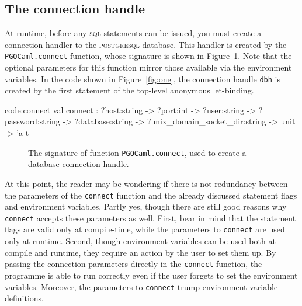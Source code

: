 \documentclass[11pt]{article}
\newcommand{\postgresql}{\textsc{postgresql}\xspace}
\newcommand{\sql}{\textsc{sql}\xspace}
\newcommand{\displaycodesave}[1]{\fcolorbox{codeframe}{codeback}{\BUseVerbatim[numbers=right,formatcom=\color{codefront},fontsize=\footnotesize]{#1}}}
\begin{document}

\subsection{The connection handle}
\label{sec:connect}

At runtime, before any \sql statements can be issued, you must create a
connection handler to the \postgresql database.  This handler is created by the
\texttt{PGOCaml.connect} function, whose signature is shown in Figure~\ref{fig:connect}.
Note that the optional parameters for this function mirror those available via the
environment variables.  In the code shown in Figure~\ref{fig:one}, the connection handle
\texttt{dbh} is created by the first statement of the top-level anonymous let-binding.

\begin{SaveVerbatim}{code:connect}
val connect :
	?host:string ->
	?port:int ->
	?user:string ->
	?password:string ->
	?database:string ->
	?unix_domain_socket_dir:string ->
	unit -> 'a t
\end{SaveVerbatim}

\begin{figure}[!ht]
\centering
\displaycodesave{code:connect}
\caption{The signature of function \texttt{PGOCaml.connect},
used to create a database connection handle.}
\label{fig:connect}
\end{figure}

At this point, the reader may be wondering if there is not redundancy between the
parameters of the \texttt{connect} function and the already discussed statement
flags and environment variables.  Partly yes, though there are still good reasons
why \texttt{connect} accepts these parameters as well.  First, bear in mind that the
statement flags are valid only at compile-time, while the parameters to \texttt{connect}
are used only at runtime.  Second, though environment variables can be used both at
compile and runtime, they require an action by the user to set them up.  By passing
the connection parameters directly in the \texttt{connect} function, the programme
is able to run correctly even if the user forgets to set the environment variables.
Moreover, the parameters to \texttt{connect} trump environment variable definitions.


\end{document}
